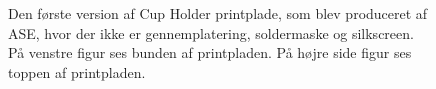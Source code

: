 \documentclass[HardwareDesign/HardwareDesign_main.tex]{subfiles}
\begin{document}
\begin{figure}[H]
\centering
{}
\caption{Den første version af Cup Holder printplade, som blev produceret af ASE, hvor der ikke er gennemplatering, soldermaske og silkscreen. På venstre figur ses bunden af printpladen. På højre side figur ses toppen af printpladen.}
\label{fig:CupHolderRev1}
\end{figure}
\end{document}
